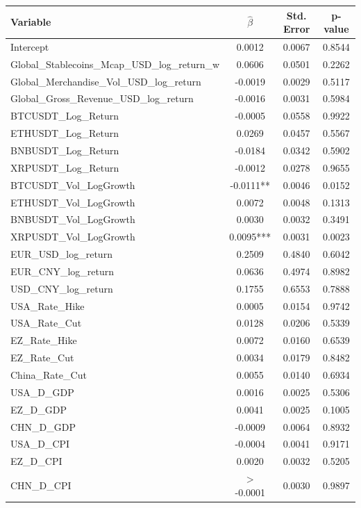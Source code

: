 \begin{tabular}{lccc}
  \toprule
  \textbf{Variable} & \textbf{$\hat{\beta}$} & \textbf{Std. Error} & \textbf{p-value} \\ 
  \midrule
  Intercept & 0.0012 & 0.0067 & 0.8544 \\ 
  Global\_Stablecoins\_Mcap\_USD\_log\_return\_w & 0.0606 & 0.0501 & 0.2262 \\ 
  Global\_Merchandise\_Vol\_USD\_log\_return & -0.0019 & 0.0029 & 0.5117 \\ 
  Global\_Gross\_Revenue\_USD\_log\_return & -0.0016 & 0.0031 & 0.5984 \\ 
  BTCUSDT\_Log\_Return & -0.0005 & 0.0558 & 0.9922 \\ 
  ETHUSDT\_Log\_Return & 0.0269 & 0.0457 & 0.5567 \\ 
  BNBUSDT\_Log\_Return & -0.0184 & 0.0342 & 0.5902 \\ 
  XRPUSDT\_Log\_Return & -0.0012 & 0.0278 & 0.9655 \\ 
  BTCUSDT\_Vol\_LogGrowth & -0.0111** & 0.0046 & 0.0152 \\ 
  ETHUSDT\_Vol\_LogGrowth & 0.0072 & 0.0048 & 0.1313 \\ 
  BNBUSDT\_Vol\_LogGrowth & 0.0030 & 0.0032 & 0.3491 \\ 
  XRPUSDT\_Vol\_LogGrowth & 0.0095*** & 0.0031 & 0.0023 \\ 
  EUR\_USD\_log\_return & 0.2509 & 0.4840 & 0.6042 \\ 
  EUR\_CNY\_log\_return & 0.0636 & 0.4974 & 0.8982 \\ 
  USD\_CNY\_log\_return & 0.1755 & 0.6553 & 0.7888 \\ 
  USA\_Rate\_Hike & 0.0005 & 0.0154 & 0.9742 \\ 
  USA\_Rate\_Cut & 0.0128 & 0.0206 & 0.5339 \\ 
  EZ\_Rate\_Hike & 0.0072 & 0.0160 & 0.6539 \\ 
  EZ\_Rate\_Cut & 0.0034 & 0.0179 & 0.8482 \\ 
  China\_Rate\_Cut & 0.0055 & 0.0140 & 0.6934 \\ 
  USA\_D\_GDP & 0.0016 & 0.0025 & 0.5306 \\ 
  EZ\_D\_GDP & 0.0041 & 0.0025 & 0.1005 \\ 
  CHN\_D\_GDP & -0.0009 & 0.0064 & 0.8932 \\ 
  USA\_D\_CPI & -0.0004 & 0.0041 & 0.9171 \\ 
  EZ\_D\_CPI & 0.0020 & 0.0032 & 0.5205 \\ 
  CHN\_D\_CPI & $>$-0.0001 & 0.0030 & 0.9897 \\ 

\end{tabular}
